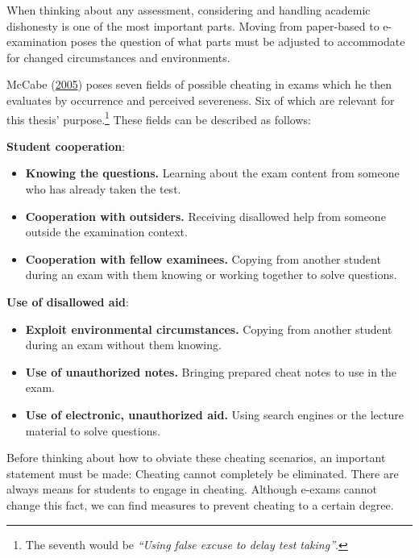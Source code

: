When thinking about any assessment, considering and handling academic
dishonesty is one of the most important parts. Moving from paper-based
to e-examination poses the question of what parts must be adjusted to
accommodate for changed circumstances and environments.

McCabe (\protect\hyperlink{ref-Mccabe2005}{2005}) poses seven fields of
possible cheating in exams which he then evaluates by occurrence and
perceived severeness. Six of which are relevant for this thesis'
purpose.\footnote{The seventh would be \emph{``Using false excuse to
  delay test taking''}.} These fields can be described as follows:

\textbf{Student cooperation}:

\begin{itemize}
\tightlist
\item
  \textbf{Knowing the questions.} Learning about the exam content from
  someone who has already taken the test.
\item
  \textbf{Cooperation with outsiders.} Receiving disallowed help from
  someone outside the examination context.
\item
  \textbf{Cooperation with fellow examinees.} Copying from another
  student during an exam with them knowing or working together to solve
  questions.
\end{itemize}

\textbf{Use of disallowed aid}:

\begin{itemize}
\tightlist
\item
  \textbf{Exploit environmental circumstances.} Copying from another
  student during an exam without them knowing.
\item
  \textbf{Use of unauthorized notes.} Bringing prepared cheat notes to
  use in the exam.
\item
  \textbf{Use of electronic, unauthorized aid.} Using search engines or
  the lecture material to solve questions.
\end{itemize}

Before thinking about how to obviate these cheating scenarios, an
important statement must be made: Cheating cannot completely be
eliminated. There are always means for students to engage in cheating.
Although e-exams cannot change this fact, we can find measures to
prevent cheating to a certain degree.

